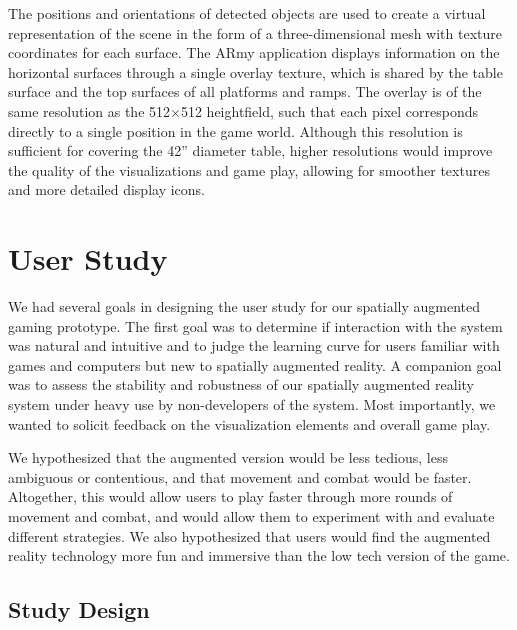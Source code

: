 \documentclass[review]{vgtc}                 %
\begin{document}
The positions and orientations of detected objects are used to create
a virtual representation of the scene in the form of a
three-dimensional mesh with texture coordinates for each surface.
The ARmy application displays information on the horizontal surfaces
through a single overlay texture, which is shared by the table surface
and the top surfaces of all platforms and ramps.  The overlay is of
the same resolution as the 512$\times$512 heightfield, such that each
pixel corresponds directly to a single position in the game world.
Although this resolution is sufficient for covering the 42'' diameter
table, higher resolutions would improve the quality of the
visualizations and game play, allowing for smoother textures and more
detailed display icons.


\section{User Study}

We had several goals in designing the user study for our
spatially augmented gaming prototype.  The first goal was to
determine if interaction with the system was natural and intuitive and
to judge the learning curve for users familiar with games and
computers but new to spatially augmented reality.  A companion goal
was to assess the stability and robustness of our spatially augmented
reality system under heavy use by non-developers of the system.  Most
importantly, we wanted to solicit feedback on the visualization
elements and overall game play.

We hypothesized that the augmented version would be less tedious, less
ambiguous or contentious, and that movement and combat would be faster.
Altogether, this would allow users to play faster through more
rounds of movement and combat, and would allow them to experiment with and
evaluate different strategies.  We also hypothesized that users
would find the augmented reality technology more fun and immersive
than the low tech version of the game.


\subsection{Study Design}
\end{document}
